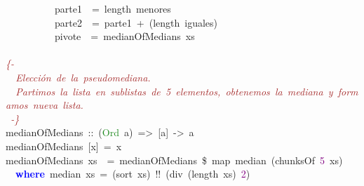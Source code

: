 \mbox{}\ \ \ \ \ \ \ \ \ \ parte1\ \ \textcolor{BrickRed}{=}\ length\ menores \\
\mbox{}\ \ \ \ \ \ \ \ \ \ parte2\ \ \textcolor{BrickRed}{=}\ parte1\ \textcolor{BrickRed}{+}\ \textcolor{BrickRed}{(}length\ iguales\textcolor{BrickRed}{)} \\
\mbox{}\ \ \ \ \ \ \ \ \ \ pivote\ \ \textcolor{BrickRed}{=}\ medianOfMedians\ xs \\
\mbox{} \\
\mbox{}\textit{\textcolor{Brown}{\{-}} \\
\mbox{}\textit{\textcolor{Brown}{\ \ Elección\ de\ la\ pseudomediana.}} \\
\mbox{}\textit{\textcolor{Brown}{\ \ Partimos\ la\ lista\ en\ sublistas\ de\ 5\ elementos,\ obtenemos\ la\ mediana\ y\ formamos\ nueva\ lista.}} \\
\mbox{}\textit{\textcolor{Brown}{\ -\}}} \\
\mbox{}medianOfMedians\ \textcolor{BrickRed}{::}\ \textcolor{BrickRed}{(}\textcolor{ForestGreen}{Ord}\ a\textcolor{BrickRed}{)}\ \textcolor{BrickRed}{=\textgreater{}}\ \textcolor{BrickRed}{[}a\textcolor{BrickRed}{]}\ \textcolor{BrickRed}{-\textgreater{}}\ a \\
\mbox{}medianOfMedians\ \textcolor{BrickRed}{[}x\textcolor{BrickRed}{]}\ \textcolor{BrickRed}{=}\ x \\
\mbox{}medianOfMedians\ xs\ \ \textcolor{BrickRed}{=}\ medianOfMedians\ \textcolor{BrickRed}{\$}\ map\ median\ \textcolor{BrickRed}{(}chunksOf\ \textcolor{Purple}{5}\ xs\textcolor{BrickRed}{)} \\
\mbox{}\ \ \textbf{\textcolor{Blue}{where}}\ median\ xs\ \textcolor{BrickRed}{=}\ \textcolor{BrickRed}{(}sort\ xs\textcolor{BrickRed}{)}\ \textcolor{BrickRed}{!!}\ \textcolor{BrickRed}{(}div\ \textcolor{BrickRed}{(}length\ xs\textcolor{BrickRed}{)}\ \textcolor{Purple}{2}\textcolor{BrickRed}{)}
